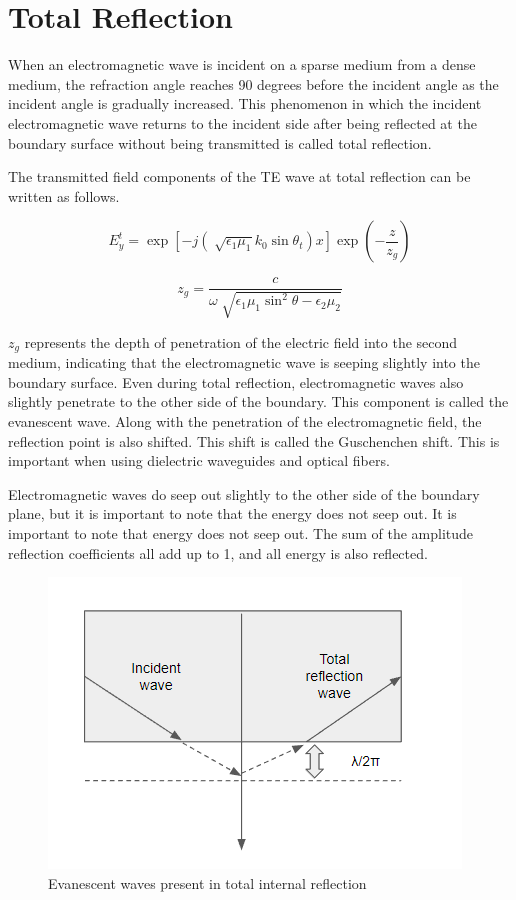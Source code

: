 \documentclass[a4paper,12pt]{report}
\begin{document}
\section{Total Reflection}

When an electromagnetic wave is incident on a sparse medium from a dense medium,
the refraction angle reaches 90 degrees before the incident angle
as the incident angle is gradually increased.
This phenomenon in which the incident electromagnetic wave
returns to the incident side after being reflected
at the boundary surface without being transmitted is called total reflection.

The transmitted field components of the TE wave at total reflection
can be written as follows.


\begin{equation}
  E^t_y = \exp[-j(\sqrt[]{\epsilon_1\mu_1}k_0\sin\theta_t)x]\exp\left(-\frac{z}{z_g}\right)
\end{equation}

\begin{equation}
  z_g = \frac{c}{\omega\sqrt[]{\epsilon_1\mu_1\sin^{2}\theta - \epsilon_2\mu_2}}
\end{equation}

$z_g$ represents the depth of penetration of the electric field into the second medium,
indicating that the electromagnetic wave is seeping slightly into the boundary surface.
Even during total reflection, 
electromagnetic waves also slightly penetrate to the other side of the boundary.
This component is called the evanescent wave.
Along with the penetration of the electromagnetic field,
the reflection point is also shifted.
This shift is called the Guschenchen shift.
This is important when using dielectric waveguides and optical fibers.


Electromagnetic waves do seep out slightly
to the other side of the boundary plane,
but it is important to note that the energy does not seep out.
It is important to note that energy does not seep out.
The sum of the amplitude reflection coefficients all add up to 1,
and all energy is also reflected.

\begin{figure}
  \begin{center}
    \includegraphics[clip, keepaspectratio, width=0.5\linewidth]{img/insertion_reflection_evanescence.png}
    \caption{Evanescent waves present in total internal reflection}
    \label{fig:insertion_reflection_evanescent}
  \end{center}
\end{figure}
\end{document}
